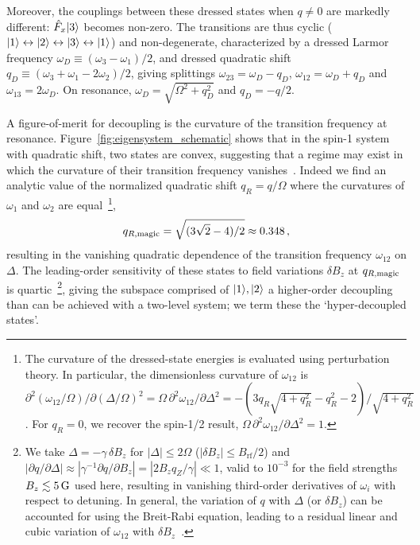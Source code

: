 \documentclass[aps,prl,reprint,superscriptaddress,floatfix]{revtex4-1}
\begin{document}
Moreover, the couplings between these dressed states when $q \neq 0$ are markedly different:
$\hat{F}_x \vert 3 \rangle $ becomes non-zero.
The transitions are thus cyclic ($\vert 1 \rangle  \leftrightarrow \vert 2 \rangle  \leftrightarrow \vert 3 \rangle  \leftrightarrow \vert 1 \rangle $) and non-degenerate, characterized by a dressed Larmor frequency $\omega_D\equiv(\omega_3-\omega_1)/2$, and dressed quadratic shift $q_D \equiv (\omega_3 + \omega_1 -2\omega_2)/2$, giving splittings $\omega_{23}=\omega_D-q_D$, $\omega_{12}=\omega_D+q_D$ and $\omega_{13}=2\omega_D$.
On resonance, $\omega_D=\sqrt{\Omega^2+q_D^2}$ and $q_D = -q/2$.

A figure-of-merit for decoupling is the curvature of the transition frequency at resonance.
Figure~\ref{fig:eigensystem_schematic} shows that in the spin-1 system with quadratic shift, two states are convex, suggesting that a regime may exist in which the curvature of their transition frequency vanishes~\cite{rabl_strong_2009,*xu_coherence-protected_2012}.
Indeed we find an analytic value of the normalized quadratic shift $q_R=q/\Omega$ where the curvatures of $\omega_1$ and $\omega_2$ are equal~\footnote{
  The curvature of the dressed-state energies is evaluated using perturbation theory. In particular, the dimensionless curvature of $\omega_{12}$ is $\partial^2(\omega_{12}/\Omega)/\partial(\Delta/\Omega)^2 = \Omega \, \partial^2\omega_{12}/\partial \Delta^2 = -(3 q_R \sqrt{4 + q_R^2} - q_R^2 - 2)/\sqrt{4 + q_R^2}$. For $q_R = 0$, we recover the spin-1/2 result, $\Omega\, \partial^2\omega_{12}/\partial \Delta^2 = 1$.},
\begin{align}
\label{eq:qRmagic}
    q_{R,\text{magic}} = \sqrt{(3\sqrt{2} - 4)/2} \approx 0.348 \, ,
\end{align}
resulting in the vanishing quadratic dependence of the transition frequency $\omega_{12}$ on $\Delta$.
The leading-order sensitivity of these states to field variations $\delta B_z$ at $q_{R,\text{magic}}$ is quartic~\footnote{
    We take $\Delta = -\gamma \, \delta B_z$ for $|\Delta | \leq 2\Omega$ ($| \delta B_z | \leq B_{\text{rf}}/2$) and $| \partial q / \partial \Delta | \approx | \gamma^{-1} \partial q / \partial B_z | = |2 B_z q_Z / \gamma| \ll 1$, valid to $10^{-3}$ for the field strengths $B_z \lesssim \unit[5]{G}$ used here, resulting in vanishing third-order derivatives of $\omega_i$ with respect to detuning. 
    In general, the variation of $q$ with $\Delta$ (or $\delta B_z$) can be accounted for using the Breit-Rabi equation, leading to a residual linear and cubic variation of $\omega_{12}$ with $\delta B_z$~\cite{trypogeorgos_synthetic_2017}.},
giving the subspace comprised of ${\vert 1 \rangle ,\vert 2 \rangle }$ a higher-order decoupling than can be achieved with a two-level system; we term these the `hyper-decoupled states'.
\end{document}
